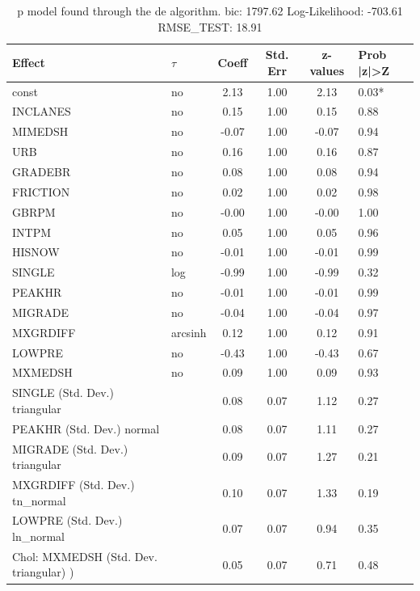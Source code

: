\begin{table}
	\caption{p model found through the de algorithm. bic: 1797.62 Log-Likelihood: -703.61 RMSE_TEST: 18.91}
	\begin{center}
		\begin{tabular}{|l|l|c|c|c|l|}
			\hline
			Effect & $\tau$ & Coeff & Std. Err & z-values & Prob |z|>Z \\
			\hline
			const & no & 2.13 & 1.00 & 2.13 & 0.03* \\
			\hline
			INCLANES & no & 0.15 & 1.00 & 0.15 & 0.88 \\
			\hline
			MIMEDSH & no & -0.07 & 1.00 & -0.07 & 0.94 \\
			\hline
			URB & no & 0.16 & 1.00 & 0.16 & 0.87 \\
			\hline
			GRADEBR & no & 0.08 & 1.00 & 0.08 & 0.94 \\
			\hline
			FRICTION & no & 0.02 & 1.00 & 0.02 & 0.98 \\
			\hline
			GBRPM & no & -0.00 & 1.00 & -0.00 & 1.00 \\
			\hline
			INTPM & no & 0.05 & 1.00 & 0.05 & 0.96 \\
			\hline
			HISNOW & no & -0.01 & 1.00 & -0.01 & 0.99 \\
			\hline
			SINGLE & log & -0.99 & 1.00 & -0.99 & 0.32 \\
			\hline
			PEAKHR & no & -0.01 & 1.00 & -0.01 & 0.99 \\
			\hline
			MIGRADE & no & -0.04 & 1.00 & -0.04 & 0.97 \\
			\hline
			MXGRDIFF & arcsinh & 0.12 & 1.00 & 0.12 & 0.91 \\
			\hline
			LOWPRE & no & -0.43 & 1.00 & -0.43 & 0.67 \\
			\hline
			MXMEDSH & no & 0.09 & 1.00 & 0.09 & 0.93 \\
			\hline
			SINGLE (Std. Dev.) triangular &  & 0.08 & 0.07 & 1.12 & 0.27 \\
			\hline
			PEAKHR (Std. Dev.) normal &  & 0.08 & 0.07 & 1.11 & 0.27 \\
			\hline
			MIGRADE (Std. Dev.) triangular &  & 0.09 & 0.07 & 1.27 & 0.21 \\
			\hline
			MXGRDIFF (Std. Dev.) tn_normal &  & 0.10 & 0.07 & 1.33 & 0.19 \\
			\hline
			LOWPRE (Std. Dev.) ln_normal &  & 0.07 & 0.07 & 0.94 & 0.35 \\
			\hline
			 Chol: MXMEDSH (Std. Dev. triangular) ) &  & 0.05 & 0.07 & 0.71 & 0.48 \\
			\hline
		\end{tabular}
	\end{center}
\end{table}